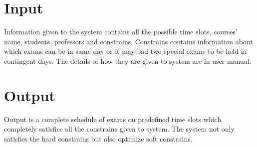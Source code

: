 \documentclass{report}
\begin{document}
\section{Input}
Information given to the system contains all the possible time slots, courses' name, students, professors and constrains. Constrains contains information about which exams can be in same day or it may bad two special exams to be held in contingent days. The details of how they are given to system are in user manual. 
\section{Output}
Output is a complete schedule of exams on predefined time slots which completely satisfies all the constrains given to system. The system not only satisfies the hard constrains but also optimize soft constrains. 
\end{document}
